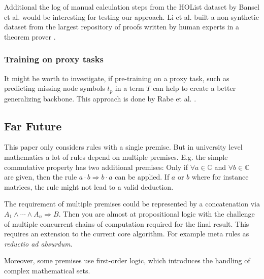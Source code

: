\documentclass{scrartcl}
\theoremstyle{definition}
\begin{document}
Additional the log of manual calculation steps from the HOList dataset by Bansel et al. \cite{kaliszyk2017holstep} would be interesting for testing our approach.
Li et al. built a non-synthetic dataset from the largest repository of proofs written by human experts in a theorem prover \cite{li2021isarstep}.

\subsubsection{Training on proxy tasks}

It might be worth to investigate, if pre-training on a proxy task, such as predicting missing node symbols $t_p$ in a term $T$ can help to create a better generalizing backbone.
This approach is done by Rabe et al. \cite{rabe2020mathematical}.

\subsection{Far Future}

This paper only considers rules with a single premise.
But in university level mathematics a lot of rules depend on multiple premises.
E.g. the simple commutative property has two additional premises: Only if $\forall a \in \mathbb{C}$ and $\forall b \in \mathbb{C}$ are given,
then the rule $a\cdot b \Longrightarrow b\cdot a$ can be applied. If $a$ or $b$ where for instance matrices, the rule might not lead to a valid deduction.

The requirement of multiple premises could be represented by a concatenation via $A_1 \wedge \cdots \wedge A_n \Longrightarrow B$.
Then you are almost at propositional logic with the challenge of multiple concurrent chains of computation required for the final result.
This requires an extension to the current core algorithm. For example meta rules as \textit{reductio ad absurdum}.

Moreover, some premises use first-order logic, which introduces the handling of complex mathematical sets.


\printbibliography
\end{document}
